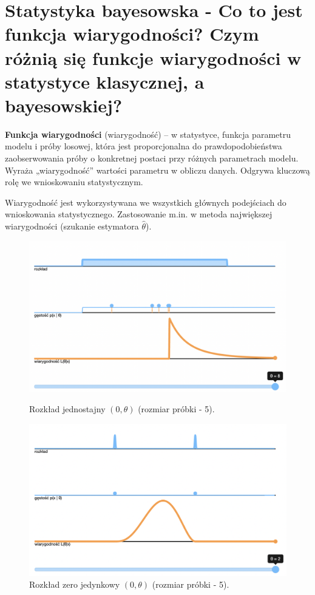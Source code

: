 \section{Statystyka bayesowska - Co to jest funkcja wiarygodności?
Czym różnią się funkcje wiarygodności w statystyce klasycznej, a bayesowskiej?}

\textbf{Funkcja wiarygodności} (wiarygodność) – w statystyce, funkcja parametru modelu i próby losowej,
która jest proporcjonalna do prawdopodobieństwa zaobserwowania próby o konkretnej postaci przy różnych parametrach modelu.
Wyraża „wiarygodność” wartości parametru w obliczu danych.
Odgrywa kluczową rolę we wnioskowaniu statystycznym.

Wiarygodność jest wykorzystywana we wszystkich głównych podejściach do wnioskowania statystycznego.
Zastosowanie m.in. w metoda największej wiarygodności (szukanie estymatora $\hat{\theta}$).

\begin{figure}
    \centering
    \begin{minipage}{0.45\textwidth}
        \centering
        \includegraphics[scale=0.27]{images/likelihood-uniform}
        \caption{Rozkład jednostajny $(0, \theta)$ (rozmiar próbki - 5).}
    \end{minipage}
    \begin{minipage}{0.45\textwidth}
        \centering
        \includegraphics[scale=0.27]{images/likelihood-zero-one}
        \caption{Rozkład zero jedynkowy $(0, \theta)$ (rozmiar próbki - 5).}
    \end{minipage}
\end{figure}

